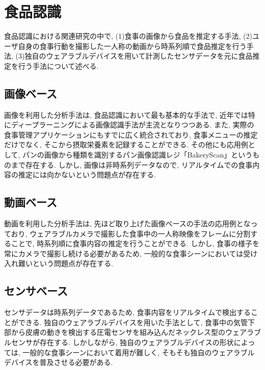 \section{食品認識}

食品認識における関連研究の中で, (1)食事の画像から食品を推定する手法, (2)ユーザ自身の食事行動を撮影した一人称の動画から時系列順で食品推定を行う手法, (3)独自のウェアラブルデバイスを用いて計測したセンサデータを元に食品推定を行う手法について述べる.

\subsection{画像ベース}

画像を利用した分析手法は, 食品認識において最も基本的な手法で, 近年では特にディープラーニングによる画像認識手法が主流となりつつある\cite{10.1145/3063592}. また, 実際の食事管理アプリケーションにもすでに広く統合されており, 食事メニューの推定だけでなく, そこから摂取栄養素を記録することができる. その他にも応用例として, パンの画像から種類を識別するパン画像認識レジ「BakeryScan」というものまで存在する\cite{1523669555317207552}. しかし, 画像は非時系列データなので, リアルタイムでの食事内容の推定には向かないという問題点が存在する.

\subsection{動画ベース}

動画を利用した分析手法は, 先ほど取り上げた画像ベースの手法の応用例となっており, ウェアラブルカメラで撮影した食事中の一人称映像をフレームに分割することで, 時系列順に食事内容の推定を行うことができる\cite{10.1145/3551626.3564964}. しかし, 食事の様子を常にカメラで撮影し続ける必要があるため, 一般的な食事シーンにおいては受け入れ難いという問題点が存在する.

\subsection{センサベース}

センサデータは時系列データであるため, 食事内容をリアルタイムで検出することができる. 独自のウェアラブルデバイスを用いた手法として, 食事中の気管下部から皮膚の動きを検出する圧電センサを組み込んだネックレス型のウェアラブルセンサが存在する\cite{app12126135}. しかしながら, 独自のウェアラブルデバイスの形状によっては, 一般的な食事シーンにおいて着用が難しく, そもそも独自のウェアラブルデバイスを普及させる必要がある.

